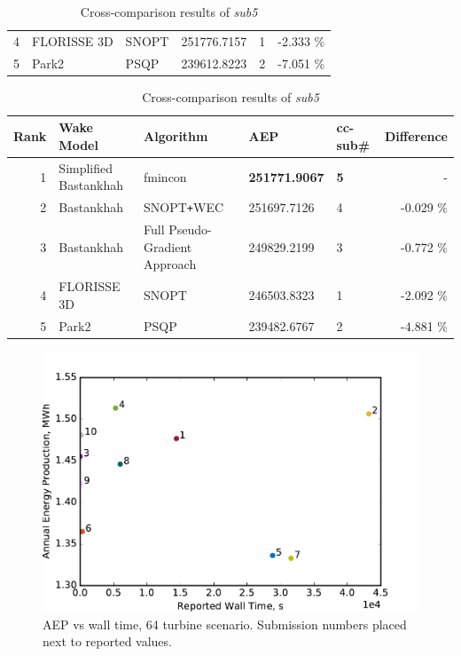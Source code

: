\begin{table}[htbp]
\begin{center}
\begin{tabular}{r l l l l r}
						4	& FLORISSE 3D			& SNOPT											& 251776.7157			& 1 		&-2.333 \%\\
						5	& Park2					& PSQP											& 239612.8223			& 2 		&-7.051 \%\\
					\hline
				\end{tabular}
			\end{center}
			\begin{center}
			\caption{Cross-comparison results of \textit{sub5}}
			\label{tab:sub5cc}
				\begin{tabular}{r l l l l r}
					\hline
					Rank			& Wake Model 			& Algorithm										& AEP					& cc-sub\#	& Difference	\\
					\hline
							1 		& Simplified Bastankhah	& fmincon										& \textbf{251771.9067}	& \textbf{5}& - \\	
							2 		& Bastankhah			& SNOPT\texttt{+}WEC 							& 251697.7126			& 4 		&-0.029 \%\\
							3		& Bastankhah			& Full Pseudo-Gradient Approach					& 249829.2199			& 3 		&-0.772 \%\\
							4		& FLORISSE 3D			& SNOPT											& 246503.8323			& 1 		&-2.092 \%\\
							5		& Park2					& PSQP											& 239482.6767			& 2 		&-4.881 \%\\
					\hline
				\end{tabular}
			\end{center}
		\end{table}
	
	\begin{figure}[htbp]
	    \centering
	    \includegraphics[width=5in]{./figures/AEP_vs_time.pdf}
	    \caption{AEP vs wall time, 64 turbine scenario. Submission numbers placed next to reported values.}
	    \label{fig:AEPvTime}
	\end{figure}

